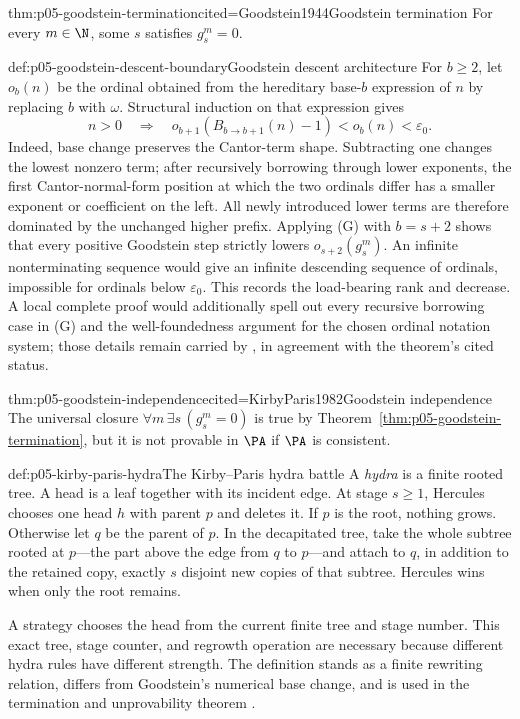 \begin{hbtheorem}{thm:p05-goodstein-termination}{cited=Goodstein1944}{Goodstein termination}
For every \(m\in\N\), some \(s\) satisfies \(g^m_s=0\).
\end{hbtheorem}

\begin{proofboundary}{def:p05-goodstein-descent-boundary}{Goodstein descent architecture}
For \(b\geq2\), let \(o_b(n)\) be the ordinal obtained from the hereditary
base-\(b\) expression of \(n\) by replacing \(b\) with \(\omega\).  Structural
induction on that expression gives
\[
 n>0\quad\Longrightarrow\quad
 o_{b+1}(B_{b\to b+1}(n)-1)<o_b(n)<\varepsilon_0.       \tag{G}
\]
Indeed, base change preserves the Cantor-term shape.  Subtracting one changes
the lowest nonzero term; after recursively borrowing through lower exponents,
the first Cantor-normal-form position at which the two ordinals differ has a
smaller exponent or coefficient on the left.  All newly introduced lower
terms are therefore dominated by the unchanged higher prefix.  Applying (G)
with \(b=s+2\) shows that every positive Goodstein step strictly lowers
\(o_{s+2}(g^m_s)\).  An infinite nonterminating sequence would give an
infinite descending sequence of ordinals, impossible for ordinals below
\(\varepsilon_0\).  This records the load-bearing rank and decrease.  A local
complete proof would additionally spell out every recursive borrowing case in
(G) and the well-foundedness argument for the chosen ordinal notation system;
those details remain carried by \cite{Goodstein1944,KirbyParis1982}, in
agreement with the theorem's cited status.
\end{proofboundary}

\begin{hbtheorem}{thm:p05-goodstein-independence}{cited=KirbyParis1982}{Goodstein independence}
The universal closure \(\forall m\,\exists s\,(g^m_s=0)\) is true by
Theorem~\ref{thm:p05-goodstein-termination}, but it is not provable in
\(\PA\) if \(\PA\) is consistent.
\end{hbtheorem}

\begin{hbdefinition}{def:p05-kirby-paris-hydra}{The Kirby--Paris hydra battle}
A \emph{hydra} is a finite rooted tree.  A head is a leaf together with its
incident edge.  At stage \(s\geq1\), Hercules chooses one head \(h\) with
parent \(p\) and deletes it.  If \(p\) is the root, nothing grows.  Otherwise
let \(q\) be the parent of \(p\).  In the decapitated tree, take the whole
subtree rooted at \(p\)---the part above the edge from \(q\) to \(p\)---and
attach to \(q\), in addition to the retained copy, exactly \(s\) disjoint new
copies of that subtree.  Hercules wins when only the root remains.

A strategy chooses the head from the current finite tree and stage number.
This exact tree, stage counter, and regrowth operation are necessary because
different hydra rules have different strength.  The definition stands as a
finite rewriting relation, differs from Goodstein's numerical base change,
and is used in the termination and unprovability theorem
\cite{KirbyParis1982}.
\end{hbdefinition}

